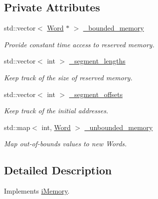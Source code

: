 \subsection*{Private Attributes}
\begin{DoxyCompactItemize}
\item 
\hypertarget{classMemory_a6391f325c42a93f4c56f0c44e6b35fda}{
std::vector$<$ \hyperlink{classWord}{Word} $\ast$ $>$ \hyperlink{classMemory_a6391f325c42a93f4c56f0c44e6b35fda}{\_\-bounded\_\-memory}}
\label{classMemory_a6391f325c42a93f4c56f0c44e6b35fda}

\begin{DoxyCompactList}\small\item\em Provide constant time access to reserved memory. \item\end{DoxyCompactList}\item 
\hypertarget{classMemory_a3e5675ae2bc551a9c5429525e2dce857}{
std::vector$<$ int $>$ \hyperlink{classMemory_a3e5675ae2bc551a9c5429525e2dce857}{\_\-segment\_\-lengths}}
\label{classMemory_a3e5675ae2bc551a9c5429525e2dce857}

\begin{DoxyCompactList}\small\item\em Keep track of the size of reserved memory. \item\end{DoxyCompactList}\item 
\hypertarget{classMemory_a29d6fa2f1774f0c770130c968820d008}{
std::vector$<$ int $>$ \hyperlink{classMemory_a29d6fa2f1774f0c770130c968820d008}{\_\-segment\_\-offsets}}
\label{classMemory_a29d6fa2f1774f0c770130c968820d008}

\begin{DoxyCompactList}\small\item\em Keep track of the initial addresses. \item\end{DoxyCompactList}\item 
\hypertarget{classMemory_a36f459f042295fb06b4d7ec9b397f952}{
std::map$<$ int, \hyperlink{classWord}{Word} $>$ \hyperlink{classMemory_a36f459f042295fb06b4d7ec9b397f952}{\_\-unbounded\_\-memory}}
\label{classMemory_a36f459f042295fb06b4d7ec9b397f952}

\begin{DoxyCompactList}\small\item\em Map out-\/of-\/bounds values to new Words. \item\end{DoxyCompactList}\end{DoxyCompactItemize}


\subsection{Detailed Description}
Implements \hyperlink{classiMemory}{iMemory}. 